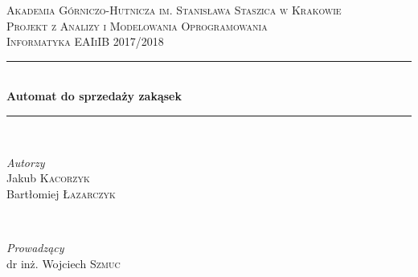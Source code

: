 \documentclass[11pt]{article}
\begin{document}
	
	\begin{titlepage} 
	
		\newcommand{\HRule}{\rule{\linewidth}{0.5mm}} %
		
		\center %
		
		
		\textsc{\LARGE Akademia Górniczo-Hutnicza im. Stanisława Staszica w Krakowie}\\[1.5cm] %
		
		\textsc{\Large Projekt z Analizy i Modelowania Oprogramowania}\\[0.5cm] %
		
		\textsc{\large Informatyka EAIiIB 2017/2018}\\[0.5cm] %
		
		
		\HRule\\[0.4cm]
		
		{\huge\bfseries Automat do sprzedaży zakąsek}\\[0.4cm] %
		
		\HRule\\[1.5cm]
		
		
		\begin{minipage}{0.4\textwidth}
			\begin{flushleft}
				\large
				\textit{Autorzy}\\
				Jakub \textsc{Kacorzyk} \\
				Bartłomiej \textsc{Łazarczyk}
			\end{flushleft}
		\end{minipage}
		~
		\begin{minipage}{0.4\textwidth}
			\begin{flushright}
				\large
				\textit{Prowadzący}\\
				dr inż. Wojciech \textsc{Szmuc} %
			\end{flushright}
		\end{minipage}
		

\end{titlepage}
\end{document}
